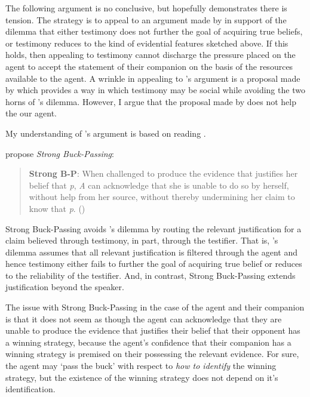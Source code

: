 \documentclass[10pt]{article}
\begin{document}
The following argument is no conclusive, but hopefully demonstrates there is tension.
The strategy is to appeal to an argument made by \textcite{Lackey:2008aa} in support of the dilemma that either testimony does not further the goal of acquiring true beliefs, or testimony reduces to the kind of evidential features sketched above.
If this holds, then appealing to testimony cannot discharge the pressure placed on the agent to accept the statement of their companion on the basis of the resources available to the agent.
A wrinkle in appealing to \citeauthor{Lackey:2008aa}'s argument is a proposal made by \textcite{Baker:2018ab} which provides a way in which testimony may be social while avoiding the two horns of \citeauthor{Lackey:2008aa}'s dilemma.
However, I argue that the proposal made by \citeauthor{Baker:2018ab} does not help the our agent.

\begin{note}
  My understanding of \citeauthor{Lackey:2008aa}'s argument is based on reading \textcite{Baker:2018ab}.
\end{note}

\citeauthor{Baker:2018ab} propose \emph{Strong Buck-Passing}:

\begin{quote}
  \textbf{Strong B-P}: When challenged to produce the evidence that justifies her belief that \emph{p}, \emph{A} can acknowledge that she is unable to do so by herself, without help from her source, without thereby undermining her claim to know that \emph{p}.\nolinebreak
  \mbox{}\hfill\mbox{}(\citeyear[8]{Baker:2018aa})
\end{quote}

Strong Buck-Passing avoids \citeauthor{Lackey:2008aa}'s dilemma by routing the relevant justification for a claim believed through testimony, in part, through the testifier.
That is, \citeauthor{Lackey:2008aa}'s dilemma assumes that all relevant justification is filtered through the agent and hence testimony either fails to further the goal of acquiring true belief or reduces to the reliability of the testifier.
And, in contrast, Strong Buck-Passing extends justification beyond the speaker.

The issue with Strong Buck-Passing in the case of the agent and their companion is that it does not seem as though the agent can acknowledge that they are unable to produce the evidence that justifies their belief that their opponent has a winning strategy, because the agent's confidence that their companion has a winning strategy is premised on their possessing the relevant evidence.
For sure, the agent may `pass the buck' with respect to \emph{how to identify} the winning strategy, but the existence of the winning strategy does not depend on it's identification.
\end{document}
